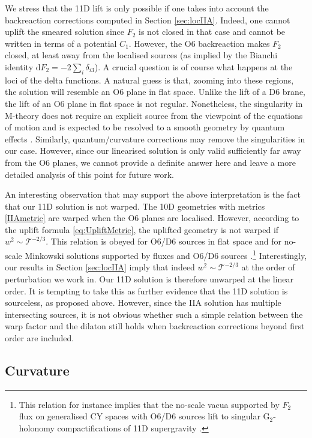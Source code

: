 \documentclass[11pt]{article}
\renewcommand{\[}{\left[}
\renewcommand{\]}{\right]}
\renewcommand{\(}{\left(}
\renewcommand{\)}{\right)}
\renewcommand{\d}{\textrm{d}}
\newcommand{\<}{\langle}
\renewcommand{\>}{\rangle}
\begin{document}
We stress that the 11D lift is only possible if one takes into account the backreaction corrections computed in Section \ref{sec:locIIA}. Indeed, one cannot uplift the smeared solution since $F_2$ is not closed in that case and cannot be written in terms of a potential $C_1$. However, the O6 backreaction makes $F_2$ closed, at least away from the localised sources (as implied by the Bianchi identity $\d F_2 = -2 \sum_i \delta_{i3}$). A crucial question is of course what happens at the loci of the delta functions. A natural guess is that, zooming into these regions, the solution will resemble an O6 plane in flat space. Unlike the lift of a D6 brane, the lift of an O6 plane in flat space is not regular. Nonetheless, the singularity in M-theory does not require an explicit source from the viewpoint of the equations of motion and is expected to be resolved to a smooth geometry by quantum effects \cite{Seiberg:1996nz}.
Similarly, quantum/curvature corrections may remove the singularities in our case. However, since our linearised solution is only valid sufficiently far away from the O6 planes, we cannot provide a definite answer here and leave a more detailed analysis of this point for future work.

An interesting observation that may support the above interpretation is the fact that our 11D solution is not warped. The 10D geometries with metrics \eqref{IIAmetric} are warped when the O6 planes are localised.  However, according to the uplift formula \eqref{eq:UpliftMetric}, the uplifted geometry is not warped if $w^2 \sim  \mathcal{T}^{-2/3}$. This relation is obeyed for O6/D6 sources in flat space and for no-scale Minkowski solutions supported by fluxes and O6/D6 sources \cite{Grana:2006kf, Blaback:2010sj}.\footnote{This relation for instance implies that the no-scale vacua supported by $F_2$ flux on generalised CY spaces with O6/D6 sources lift to singular G$_2$-holonomy compactifications of 11D supergravity \cite{Andriolo:2018yrz}.}  Interestingly, our results in Section \ref{sec:locIIA} imply that indeed $w^2 \sim \mathcal{T}^{-2/3}$ at the order of perturbation we work in. Our 11D solution is therefore unwarped at the linear order. It is tempting to take this as further evidence that the 11D solution is sourceless, as proposed above. However, since the IIA solution has multiple intersecting sources, it is not obvious whether such a simple relation between the warp factor and the dilaton still holds when backreaction corrections beyond first order are included.


\subsection{Curvature}
\end{document}
